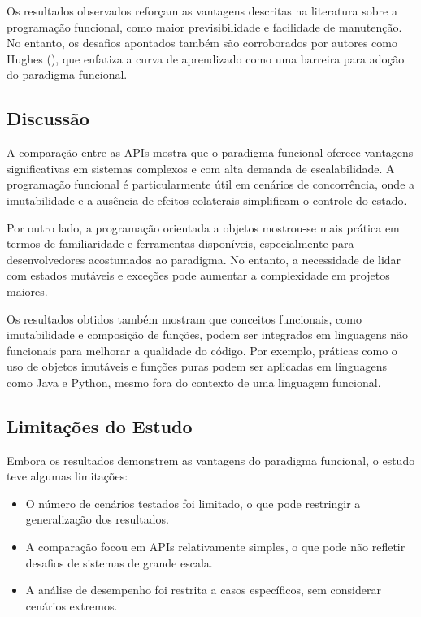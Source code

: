 Os resultados observados reforçam as vantagens descritas na literatura sobre a programação funcional, como maior previsibilidade e facilidade de manutenção. No entanto, os desafios apontados também são corroborados por autores como Hughes (\citeyear{Hughes90}), que enfatiza a curva de aprendizado como uma barreira para adoção do paradigma funcional.

\subsection{Discussão}

A comparação entre as APIs mostra que o paradigma funcional oferece vantagens significativas em sistemas complexos e com alta demanda de escalabilidade. A programação funcional é particularmente útil em cenários de concorrência, onde a imutabilidade e a ausência de efeitos colaterais simplificam o controle do estado.

Por outro lado, a programação orientada a objetos mostrou-se mais prática em termos de familiaridade e ferramentas disponíveis, especialmente para desenvolvedores acostumados ao paradigma. No entanto, a necessidade de lidar com estados mutáveis e exceções pode aumentar a complexidade em projetos maiores.

Os resultados obtidos também mostram que conceitos funcionais, como imutabilidade e composição de funções, podem ser integrados em linguagens não funcionais para melhorar a qualidade do código. Por exemplo, práticas como o uso de objetos imutáveis e funções puras podem ser aplicadas em linguagens como Java e Python, mesmo fora do contexto de uma linguagem funcional.

\subsection{Limitações do Estudo}

Embora os resultados demonstrem as vantagens do paradigma funcional, o estudo teve algumas limitações:
\begin{itemize}
    \item O número de cenários testados foi limitado, o que pode restringir a generalização dos resultados.
    \item A comparação focou em APIs relativamente simples, o que pode não refletir desafios de sistemas de grande escala.
    \item A análise de desempenho foi restrita a casos específicos, sem considerar cenários extremos.
\end{itemize}


